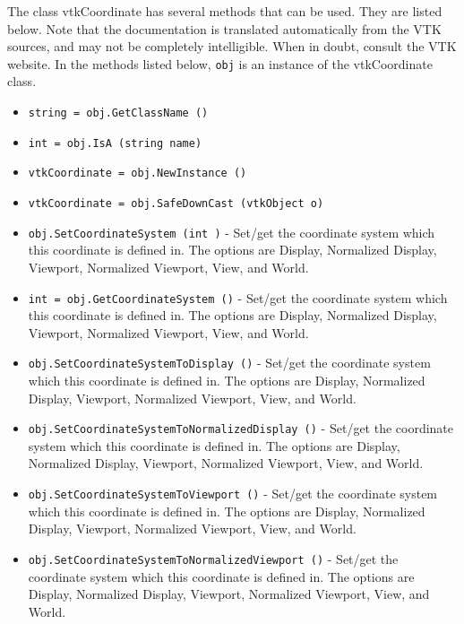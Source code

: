 The class vtkCoordinate has several methods that can be used.
  They are listed below.
Note that the documentation is translated automatically from the VTK sources,
and may not be completely intelligible.  When in doubt, consult the VTK website.
In the methods listed below, \verb|obj| is an instance of the vtkCoordinate class.
\begin{itemize}
\item  \verb|string = obj.GetClassName ()|

\item  \verb|int = obj.IsA (string name)|

\item  \verb|vtkCoordinate = obj.NewInstance ()|

\item  \verb|vtkCoordinate = obj.SafeDownCast (vtkObject o)|

\item  \verb|obj.SetCoordinateSystem (int )| -  Set/get the coordinate system which this coordinate
 is defined in. The options are Display, Normalized Display,
 Viewport, Normalized Viewport, View, and World.

\item  \verb|int = obj.GetCoordinateSystem ()| -  Set/get the coordinate system which this coordinate
 is defined in. The options are Display, Normalized Display,
 Viewport, Normalized Viewport, View, and World.

\item  \verb|obj.SetCoordinateSystemToDisplay ()| -  Set/get the coordinate system which this coordinate
 is defined in. The options are Display, Normalized Display,
 Viewport, Normalized Viewport, View, and World.

\item  \verb|obj.SetCoordinateSystemToNormalizedDisplay ()| -  Set/get the coordinate system which this coordinate
 is defined in. The options are Display, Normalized Display,
 Viewport, Normalized Viewport, View, and World.

\item  \verb|obj.SetCoordinateSystemToViewport ()| -  Set/get the coordinate system which this coordinate
 is defined in. The options are Display, Normalized Display,
 Viewport, Normalized Viewport, View, and World.

\item  \verb|obj.SetCoordinateSystemToNormalizedViewport ()| -  Set/get the coordinate system which this coordinate
 is defined in. The options are Display, Normalized Display,
 Viewport, Normalized Viewport, View, and World.


\end{itemize}
